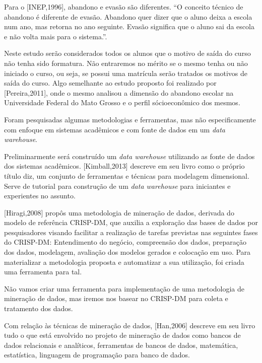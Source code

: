 Para o [INEP,1996], abandono e evasão são diferentes. “O conceito técnico de abandono é diferente de evasão. Abandono quer dizer que o aluno deixa a escola num ano, mas retorna no ano seguinte. Evasão significa que o aluno sai da escola e não volta mais para o sistema.”.

Neste estudo serão considerados todos os alunos que o motivo de saída do curso não tenha sido formatura. Não entraremos no mérito se o mesmo tenha ou não iniciado o curso, ou seja, se possui uma matrícula serão tratados os motivos de saída do curso. Algo semelhante ao estudo proposto foi realizado por [Pereira,2011], onde o mesmo analisou a dimensão do abandono escolar na Universidade Federal do Mato Grosso e o perfil sócioeconômico dos mesmos. %

Foram pesquisadas algumas metodologias e ferramentas,  mas não especificamente com enfoque em sistemas acadêmicos e com fonte de dados em um \textit{data warehouse}. 

Preliminarmente será construído um \textit{data warehouse} utilizando as fonte de dados dos sistemas acadêmicos. [Kimball,2013] %
descreve em seu livro como o próprio título diz, um conjunto de  ferramentas e técnicas para modelagem dimensional. Serve de tutorial para construção de um \textit{data warehouse} para iniciantes e experientes no assunto.

[Hiragi,2008] %
propôs uma metodologia de mineração de dados, derivada do modelo de referência CRISP-DM, que auxilia a exploração das bases de dados por pesquisadores visando facilitar a realização de tarefas previstas  nas seguintes fases do CRISP-DM: Entendimento do negócio, compreensão dos dados, preparação dos dados, modelagem, avaliação dos modelos gerados e colocação em uso.  Para materializar  a metodologia proposta e automatizar a sua utilização, foi criada uma ferramenta para tal.

Não vamos criar uma ferramenta para implementação de uma metodologia de mineração de dados, mas iremos nos basear no CRISP-DM para coleta e tratamento dos dados.

Com relação às técnicas de mineração de dados, [Han,2006] %
descreve em seu livro  tudo o que está envolvido no projeto de mineração de dados como bancos de dados relacionais e analíticos, ferramentas de bancos de dados, matemática, estatística, linguagem de programação para banco de dados.











